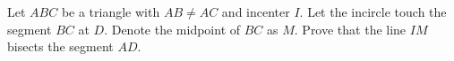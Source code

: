 Let $ABC$ be a triangle with $AB \neq AC$ and incenter $I$.
Let the incircle touch the segment $BC$ at $D$. Denote the midpoint of $BC$ as $M$.
Prove that the line $IM$ bisects the segment $AD$.